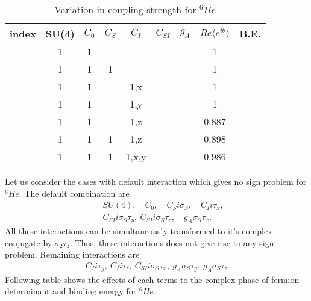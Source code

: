 \documentclass[10pt]{book}
\newcommand{\bea}{\begin{eqnarray}}
\newcommand{\eea}{\end{eqnarray}}
\newcommand{\no}{\nonumber \\}
\def\la{\langle}
\def\ra{\rangle}
\begin{document}
\begin{table}
\caption{Variation in coupling strength for $^6He$}
\begin{center}
\begin{tabular}{c|cccccc|cc}
index & SU(4) & $C_0$ & $C_S$ & $C_I$ & $C_{SI}$ & $g_A$ 
  & $Re \la e^{i\theta}\ra$ & B.E. \\ \hline
      & 1     &    1   &       &       &          &  
      & 1 &  \\
      & 1     &    1   &  1     &       &          &  
      & 1 &  \\            
      & 1     &    1   &       &    1,x   &          &  
      & 1 &  \\ 
      & 1     &    1   &       &    1,y   &          &  
      & 1 &  \\  
      & 1     &    1   &       &    1,z   &          &  
      & 0.887 &  \\
      & 1     &    1   &   1    &    1,z   &          &  
      & 0.898 &  \\ 
     & 1     &    1   &   1    &    1,x,y   &          &  
      & 0.986 &  \\                              
\end{tabular}  
\end{center} 
\end{table} 

\newpage
Let us consider the cases with default interaction
which gives no sign problem for ${}^6He$.
The default combination are
\bea 
& &SU(4),\quad C_0, \quad C_S i\sigma_S ,\quad C_I i\tau_x,\no 
& & C_{SI} i\sigma_S\tau_y,\ C_{SI} i\sigma_S\tau_z,
\quad g_A \sigma_S\tau_x.
\eea
All these interactions can be simultaneously transformed 
to it's complex conjugate
by $\sigma_2\tau_z$. Thus, these interactions does not give rise
to any sign problem.   
Remaining interactions are
\bea
 C_I i \tau_y,\ C_I i \tau_z,\ C_{SI} i\sigma_S\tau_x,\
 g_A \sigma_S\tau_y,\ g_A \sigma_S\tau_z
\eea
Following table shows the effects of each terms to the
complex phase of fermion determinant and
binding energy for $^6He$.
  
\end{document}
